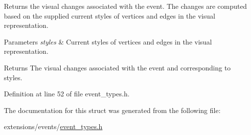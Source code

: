 Returns the visual changes associated with the event. The changes are computed based on the supplied current styles of vertices and edges in the visual representation. 


\begin{DoxyParams}{Parameters}
{\em styles} & Current styles of vertices and edges in the visual representation. \\
\hline
\end{DoxyParams}
\begin{DoxyReturn}{Returns}
The visual changes associated with the event and corresponding to {\ttfamily styles}. 
\end{DoxyReturn}


Definition at line 52 of file event\+\_\+types.\+h.



The documentation for this struct was generated from the following file\+:\begin{DoxyCompactItemize}
\item 
extensions/events/\hyperlink{event__types_8h}{event\+\_\+types.\+h}\end{DoxyCompactItemize}
